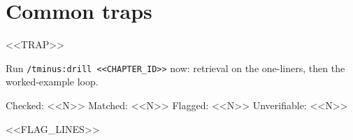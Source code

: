 \documentclass[11pt]{article}
\begin{document}
\section*{Common traps}
\begin{tmtrap}
<<TRAP>>
\end{tmtrap}

\begin{tmdrill}
Run \texttt{/tminus:drill <<CHAPTER_ID>>} now: retrieval on the one-liners, then the worked-example loop.
\end{tmdrill}

\begin{tmverify}
Checked: <<N>> \quad Matched: <<N>> \quad Flagged: <<N>> \quad Unverifiable: <<N>>\par
<<FLAG_LINES>>
\end{tmverify}
\end{document}
